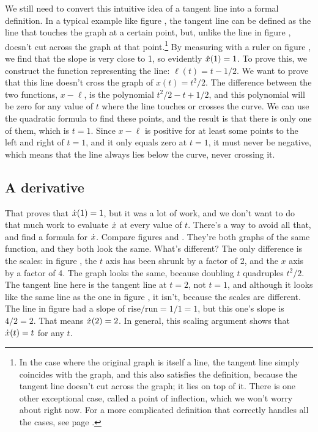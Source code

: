 We still need to convert this intuitive idea of a tangent line into a formal
definition. In a typical example like figure , the tangent
line can be defined as the line that touches the graph at a certain point,
but, unlike the line in figure , doesn't cut across 
the graph at that point.\footnote{In the case where the original
graph is itself a line, the tangent line simply coincides with the graph, and this also satisfies
the definition, because the tangent line doesn't cut across the graph; it lies on top of it.
There is one other exceptional case, called a point of inflection, which we won't worry about
right now. For a more complicated definition that correctly handles all the cases, see
page \pageref{detour:def-tangent}.} By measuring with a ruler on figure
, we find that the slope is very close to 1, so evidently
$\dot{x}(1)=1$.
To prove this, we construct the function representing the line: $\ell(t)=t-1/2$. 
We want to prove that this line doesn't cross the graph of $x(t)=t^2/2$. The difference between the
two functions, $x-\ell$, is the polynomial $t^2/2-t+1/2$, and this polynomial will be zero for any
value of $t$ where the line touches or crosses the curve. We can use the quadratic formula
to find these points, and the result is that there is only one of them, which is $t=1$.
Since $x-\ell$ is positive for at least some points to the left and right of $t=1$, and
it only equals zero at $t=1$, it must never be negative, which means that the line
always lies below the curve, never crossing it.

\subsection{A derivative}\label{scaling}
That proves that $\dot{x}(1)=1$, but it was a lot of work, and we don't want to do
that much work to evaluate $\dot{x}$ at every value of $t$. There's a way to
avoid all that, and find a formula for $\dot{x}$. Compare figures 
and . They're both graphs of the same function, and they both look the same.
What's different? The only difference is the scales: in figure , the $t$ axis
has been shrunk by a factor of 2, and the $x$ axis by a factor of 4. The graph looks the same,
because doubling $t$ quadruples $t^2/2$. The tangent line here is the tangent line at $t=2$,
not $t=1$, and although it looks like the same line as the one in figure ,
it isn't, because the scales are different. The line in figure  had a slope
of $\text{rise}/\text{run}=1/1=1$, but this one's slope is $4/2=2$. That means $\dot{x}(2)=2$.
In general, this scaling argument shows that $\dot{x}(t)=t$ for any $t$.

